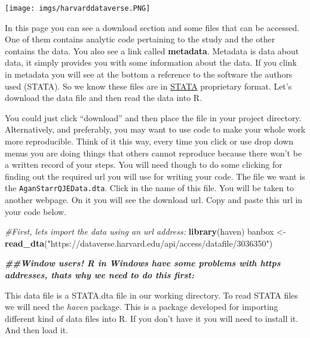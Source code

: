 \documentclass[
]{book}
\newenvironment{Shaded}{\begin{snugshade}}{\end{snugshade}}
\newcommand{\CommentTok}[1]{\textcolor[rgb]{0.56,0.35,0.01}{\textit{#1}}}
\newcommand{\DocumentationTok}[1]{\textcolor[rgb]{0.56,0.35,0.01}{\textbf{\textit{#1}}}}
\newcommand{\FunctionTok}[1]{\textcolor[rgb]{0.13,0.29,0.53}{\textbf{#1}}}
\newcommand{\NormalTok}[1]{#1}
\newcommand{\OtherTok}[1]{\textcolor[rgb]{0.56,0.35,0.01}{#1}}
\newcommand{\StringTok}[1]{\textcolor[rgb]{0.31,0.60,0.02}{#1}}
\begin{document}
\texttt{[image: imgs/harvarddataverse.PNG]}

In this page you can see a download section and some files that can be accessed. One of them contains analytic code pertaining to the study and the other contains the data. You also see a link called \textbf{metadata}. Metadata is data about data, it simply provides you with some information about the data. If you clink in metadata you will see at the bottom a reference to the software the authors used (STATA). So we know these files are in \href{https://www.stata.com/}{STATA} proprietary format. Let's download the data file and then read the data into R.

You could just click ``download'' and then place the file in your project directory. Alternatively, and preferably, you may want to use code to make your whole work more reproducible. Think of it this way, every time you click or use drop down menus you are doing things that others cannot reproduce because there won't be a written record of your steps. You will need though to do some clicking for finding out the required url you will use for writing your code. The file we want is the \texttt{AganStarrQJEData.dta}. Click in the name of this file. You will be taken to another webpage. On it you will see the download url. Copy and paste this url in your code below.

\begin{Shaded}
\begin{Highlighting}[]
\CommentTok{\#First, let\textquotesingle{}s import the data using an url address:}
\FunctionTok{library}\NormalTok{(haven)}
\NormalTok{banbox }\OtherTok{\textless{}{-}} \FunctionTok{read\_dta}\NormalTok{(}\StringTok{"https://dataverse.harvard.edu/api/access/datafile/3036350"}\NormalTok{)}

\DocumentationTok{\#\#Window users! R in Windows have some problems with https addresses, that\textquotesingle{}s why we need to do this first:}
\end{Highlighting}
\end{Shaded}

This data file is a STATA.dta file in our working directory. To read STATA files we will need the \emph{haven} package. This is a package developed for importing different kind of data files into R. If you don't have it you will need to install it. And then load it.
\end{document}
